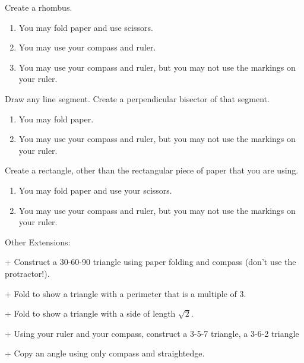 \documentclass{ximera}
\begin{document}
\begin{problem}
Create a rhombus.
\begin{enumerate}
\item You may fold paper and use scissors.
\item You may use your compass and ruler.
\item You may use your compass and ruler, but you may not use the markings on your ruler.
\end{enumerate}
\end{problem}

\begin{problem}
Draw any line segment.  Create a perpendicular bisector of that segment.
\begin{enumerate}
\item You may fold paper.
\item You may use your compass and ruler, but you may not use the markings on your ruler.
\end{enumerate}
\end{problem}

\begin{problem}
Create a rectangle, other than the rectangular piece of paper that you are using.
\begin{enumerate}
\item You may fold paper and use your scissors.
\item You may use your compass and ruler, but you may not use the markings on your ruler.
\end{enumerate}
\end{problem}


\begin{instructorIntro}
Other Extensions:

+ Construct a 30-60-90 triangle using paper folding and compass (don't use the protractor!).

+ Fold to show a triangle with a perimeter that is a multiple of 3.

+ Fold to show a triangle with a side of length $\sqrt{2}$.

+ Using your ruler and your compass, construct a 3-5-7 triangle, a 3-6-2 triangle

+ Copy an angle using only compass and straightedge.
\end{instructorIntro}
\end{document}
